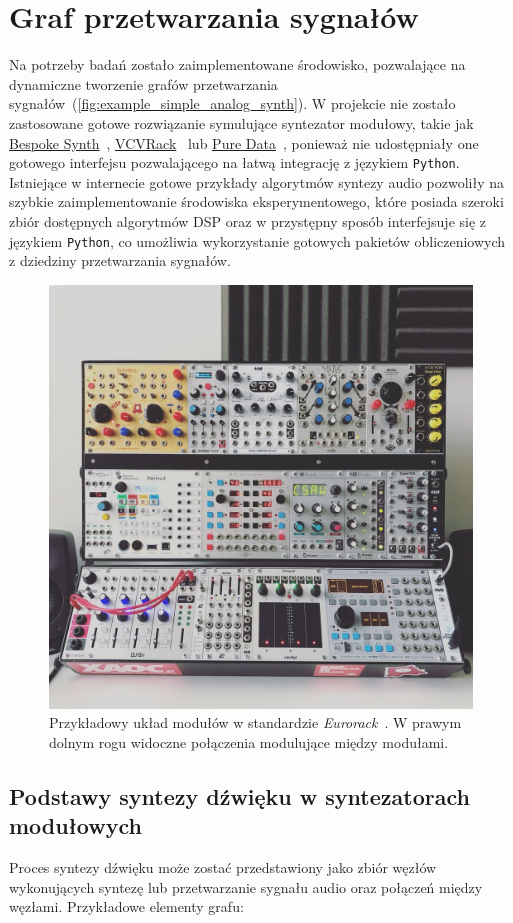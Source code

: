 \chapter{Graf przetwarzania sygnałów}\label{dsp_graph_chapter}

Na potrzeby badań zostało zaimplementowane środowisko, pozwalające na dynamiczne tworzenie grafów przetwarzania
sygnałów~(\ref{fig:example_simple_analog_synth}). W projekcie nie zostało zastosowane gotowe rozwiązanie symulujące syntezator modułowy, takie jak
\href{https://www.bespokesynth.com/}{Bespoke Synth}~\cite{bespoke}, \href{https://vcvrack.com/Rack}{VCVRack}~\cite{vcvrack}
lub \href{https://puredata.info/}{Pure Data}~\cite{pure_data}, ponieważ
nie udostępniały one gotowego interfejsu pozwalającego na łatwą integrację z językiem \texttt{Python}.
Istniejące w internecie gotowe przykłady algorytmów syntezy audio pozwoliły na szybkie zaimplementowanie
środowiska eksperymentowego, które posiada szeroki zbiór dostępnych algorytmów DSP oraz w przystępny sposób
interfejsuje się z językiem \texttt{Python}, co umożliwia wykorzystanie gotowych pakietów obliczeniowych z dziedziny przetwarzania sygnałów.

\begin{figure}[H]\label{fig:eurorack_setup}
    \centering
    \includegraphics[width=0.4\linewidth]{rys02/eurorack.jpg}
    \caption{
      Przykładowy układ modułów w standardzie \textit{Eurorack}~\cite{eurorack}.
      W prawym dolnym rogu widoczne połączenia modulujące między modułami.
    }
\end{figure}

\section{Podstawy syntezy dźwięku w syntezatorach modułowych}

Proces syntezy dźwięku może zostać przedstawiony jako zbiór węzłów wykonujących syntezę lub
przetwarzanie sygnału audio oraz połączeń między węzłami. Przykładowe elementy grafu:

